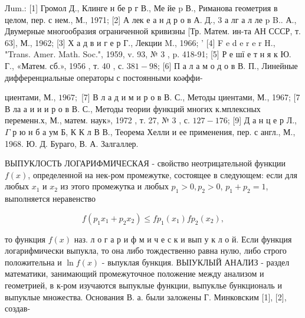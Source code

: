 \documentclass[10pt]{article}
\begin{document}
Лum.: [1] Громол Д., Клинге н бе р г В., Ме йе p В., Риманова геометрия в целом, пер. с нем., М., 1971; [2] А лек е а н д р о в А. Д., 3 а лг а л ле p B.. А., Двумерные многообразия ограниченной кривизны [Тр. Матем. ин-та АН СССР, т. 63], М., 1962; [3] Х а д в и г е р Г., Лекции M., 1966; ' [4] F e d e r e r H., "Trans. Amer. Math. Soc.", 1959, v. 93, № 3 , p. 418-91; [5] Р е шї е т н я к Ю. Г., «Матем. сб.», 1956 , т. 40 , с. $381-98$; [6] П а л а м о д о в В. П., Линейные дифференциальные операторы с постоянными коәффи-

циентами, М., $1967 ;$ [7] В л а д и м и р о в В. С., Методы циентами, М., 1967; [7 В ла а и и и р о в В. С., Методы теории функций многих к.мплексных переменн.х, М., матем. наук», 1972 , т. 27, № 3 , с. $127-176$; [9] Д а н ц е р Л., $\Gamma$ р ю н б а ум Б, К К л В В., Теорема Хелли и ее применения, пер. с англ., М., 1968. Ю. Д. Бураго, В. А. Залгаллер.



ВЫПУКЛОСТЬ ЛОГАРИФМИЧЕСКАЯ - свойство неотрицательной функции $f(x)$, определенной на нек-ром промежутке, состоящее в следующем: если для любых $x_{1}$ и $x_{2}$ из этого промежутка и любых $p_{1}>0, p_{2}>0$, $p_{1}+p_{2}=1$, выполняется неравенство



\[

f\left(p_{1} x_{1}+p_{2} x_{2}\right) \leqslant f p_{1}\left(x_{1}\right) f p_{2}\left(x_{2}\right),

\]



то функция $f(x)$ наз. л о г а р и ф м и ч е с к и вып у к л о й. Если функция логарифмически выпукла, то она либо тождественно равна нулю, либо строго положительна и $\ln f(x)$ - вьпуклая бункция. ВЫІУКЛЫЙ АНАЛИЗ - раздел математики, занимающий промежуточное положение между анализом и геометрией, в к-ром изучаются выпуклые функции, выпуклье бункциональ и выпуклые множества. Основания В. а. были заложены Г. Минковским [1], [2], создав-
\end{document}
